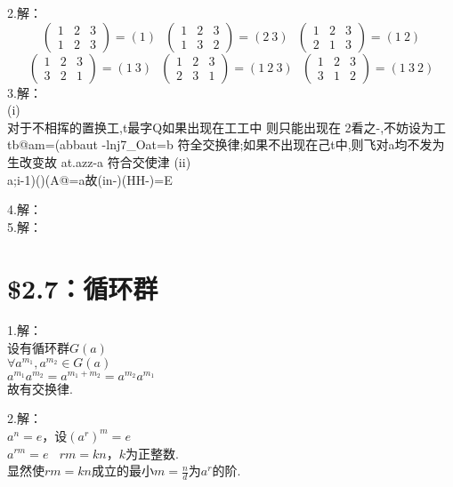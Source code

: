 \documentclass{ctexart}
\begin{document}
2.解：\\
$$
\left (\begin{array}{cccc}
	1 &2 & 3 \\
	1 &2 & 3  
\end{array}\right)=(1) \ \ \ 
\left (\begin{array}{cccc}
	1 &2 & 3 \\
	1 &3 & 2  
\end{array}\right)=(2\  3) \ \ \ 
\left (\begin{array}{cccc}
	1 &2 & 3 \\
	2 &1 & 3  
\end{array}\right)=(1 \ 2)
$$
$$
\left (\begin{array}{cccc}
	1 &2 & 3 \\
	3 &2 & 1  
\end{array}\right)=(1 \ 3) \ \ \ 
\left (\begin{array}{cccc}
	1 &2 & 3 \\
	2 &3 & 1  
\end{array}\right)=(1\ 2 \ 3) \ \ \ 
\left (\begin{array}{cccc}
	1 &2 & 3 \\
	3 &1 & 2  
\end{array}\right)=(1 \ 3 \ 2)
$$
3.解：\\
(i)\\
对于不相挥的置换工,t最字Q如果出现在工工中 则只能出现在 2看之-,不妨设为工tb@am=(abbaut -lnj7_Oat=b
符全交换律;如果不出现在己t中,则飞对a均不发为生改变故 at.azz-a 符合交使津
(ii)\\
a;i-1)()(A@=a故(in-)(HH-)=E

4.解：\\


5.解：\\




\section*{\$2.7：循环群}
1.解：\\
设有循环群$G(a)$\\
$\forall a^{m_1},a^{m_2} \in G(a)$ \\
$a^{m_1}a^{m_2}=a^{m_1+m_2}=a^{m_2}a^{m_1}$\\
故有交换律.

2.解：\\
$a^n=e$，设$(a^r)^m=e$\\
$a^{rm}=e \ \ \ \ rm=kn$，$k$为正整数.\\
显然使$rm=kn$成立的最小$m=\frac{n}{d}$为$a^r$的阶.
\end{document}
